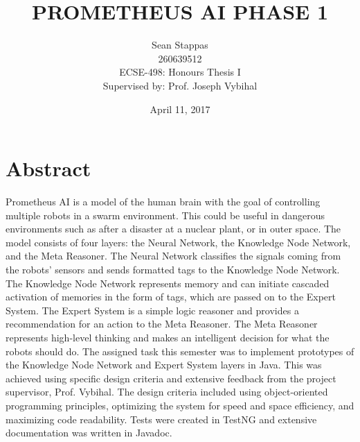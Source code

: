 \documentclass[titlepage,11pt]{article}
\title{\textbf{\uppercase{Prometheus AI Phase 1}}}
\author %
{Sean Stappas
	\\ 260639512
	\\ ECSE-498: Honours Thesis I
	\\{\small Supervised by: Prof. Joseph Vybihal}}
\date{April 11, 2017}
\begin{document}
\lstset{language=Java} 
\sloppy

\maketitle

\section*{Abstract}
Prometheus AI is a model of the human brain with the goal of controlling multiple robots in a swarm environment. This could be useful in dangerous environments such as after a disaster at a nuclear plant, or in outer space. The model consists of four layers: the Neural Network, the Knowledge Node Network, and the Meta Reasoner. The Neural Network classifies the signals coming from the robots' sensors and sends formatted tags to the Knowledge Node Network. The Knowledge Node Network represents memory and can initiate cascaded activation of memories in the form of tags, which are passed on to the Expert System. The Expert System is a simple logic reasoner and provides a recommendation for an action to the Meta Reasoner. The Meta Reasoner represents high-level thinking and makes an intelligent decision for what the robots should do. The assigned task this semester was to implement prototypes of the Knowledge Node Network and Expert System layers in Java. This was achieved using specific design criteria and extensive feedback from the project supervisor, Prof. Vybihal. The design criteria included using object-oriented programming principles, optimizing the system for speed and space efficiency, and maximizing code readability. Tests were created in TestNG and extensive documentation was written in Javadoc.

\end{document}
